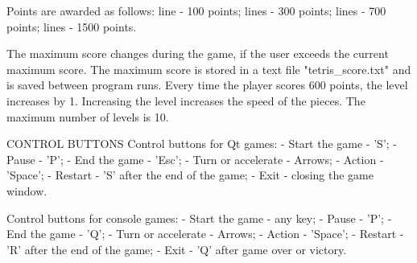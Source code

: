 \documentclass[a4paper]{article}
\begin{document}
Points are awarded as follows: line - 100 points; lines - 300 points; lines - 700 points; lines - 1500 points.\newline

The maximum score changes during the game,
if the user exceeds the current maximum score.
The maximum score is stored in a text file "tetris\_score.txt" and is saved between program runs.
\newline
Every time the player scores 600 points, the level increases by 1.
Increasing the level increases the speed of the pieces. The maximum number of levels is 10.
\newline
\newline

CONTROL BUTTONS\newline
\newline
Control buttons for Qt games:\newline
- Start the game - 'S';\newline
- Pause - 'P';\newline
- End the game - 'Esc';\newline
- Turn or accelerate - Arrows;\newline
- Action - 'Space';\newline
- Restart - 'S' after the end of the game;\newline
- Exit - closing the game window.\newline
\newline

Control buttons for console games:\newline
- Start the game - any key;\newline
- Pause - 'P';\newline
- End the game - 'Q';\newline
- Turn or accelerate - Arrows;\newline
- Action - 'Space';\newline
- Restart - 'R' after the end of the game;\newline
- Exit - 'Q' after game over or victory.
\end{document}
